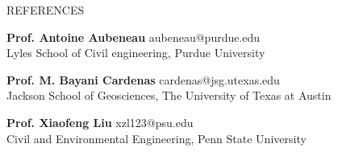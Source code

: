 \documentclass{resume_anzy.cls} %
\begin{document}
\begin{rSection}{REFERENCES}
\vspace{-2.5mm}
\item \textbf{Prof. Antoine Aubeneau} \hfill aubeneau@purdue.edu 
\\ \hspace*{\fill} Lyles School of Civil engineering, Purdue University
\vspace{2mm}
\item \textbf{Prof. M. Bayani Cardenas} \hfill cardenas@jsg.utexas.edu
\\ \hspace*{\fill} Jackson School of Geosciences, The University of Texas at Austin
\vspace{2mm}
\item \textbf{Prof. Xiaofeng Liu} \hfill xzl123@psu.edu
\\ \hspace*{\fill} Civil and Environmental Engineering, Penn State University
\end{rSection}




\end{document}
